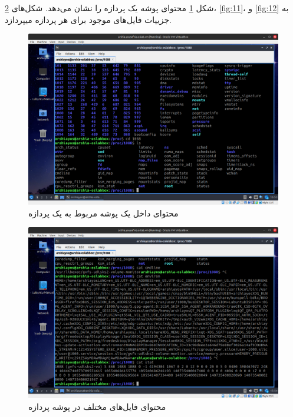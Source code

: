 \documentclass[12pt]{article}
\begin{document}
	شکل \ref{fig:9} محتوای پوشه یک پردازه را نشان می‌دهد. شکل‌های \ref{fig:10}،
	\ref{fig:11}، و
	\ref{fig:12}
	 به جزییات فایل‌های موجود برای هر پردازه‌ میپردازد.
	\begin{figure}[H]
		\centering
		\includegraphics[width=\textwidth]{report3-resources/10.png}
		\caption{محتوای داخل یک پوشه مربوط به یک پردازه}
		\label{fig:9}
	\end{figure}
	\begin{figure}[H]
		\centering
		\includegraphics[width=\textwidth]{report3-resources/11.png}
		\caption{محتوای فایل‌های مختلف در پوشه پردازه}
		\label{fig:10}
	\end{figure}
\end{document}
